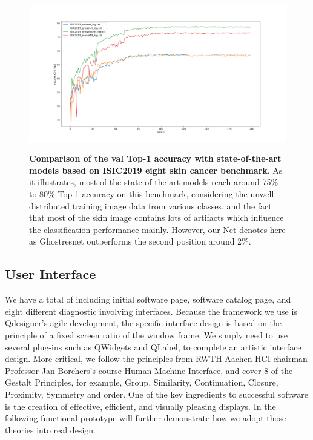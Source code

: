 {\begin{figure}[t]
\includegraphics[height=0.4\textheight,width=1\textwidth]{thesis-template-master/images/top1acc.png}
\label{fig:cellnet}
\caption{ \textbf{Comparison of the val Top-1 accuracy with state-of-the-art models based on ISIC2019 eight skin cancer benchmark}. As it illustrates, most of the state-of-the-art models reach around 75\% to 80\% Top-1 accuracy on this benchmark, considering the unwell distributed training image data from various classes, and the fact that most of the skin image contains lots of artifacts which influence the classification performance mainly. However, our Net denotes here as Ghostresnet outperforms the second position around 2\%.}
\end{figure}





\subsection{User Interface} %
\label{sub:amet}
We have a total of including initial software page, software catalog page, and eight different diagnostic involving interfaces. Because the framework we use is Qdesigner’s agile development, the specific interface design is based on the principle of a fixed screen ratio of the window frame. We simply need to use several plug-ins such as QWidgets and QLabel, to complete an artistic interface design. More critical, we follow the principles from RWTH Aachen HCI chairman Professor Jan Borchers's course Human Machine Interface, and cover 8 of the Gestalt Principles, for example, Group, Similarity, Continuation, Closure, Proximity, Symmetry and order. One of the key ingredients to successful software is the creation of effective, efficient, and visually pleasing displays. In the following functional prototype will further demonstrate how we adopt those theories into real design.

}
